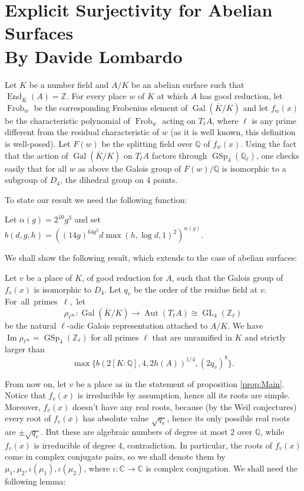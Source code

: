\section{Explicit Surjectivity for Abelian Surfaces \\ By Davide Lombardo} \label{lombardstreet}

Let $K$ be a number field and $A/K$ be an abelian surface such that $\operatorname{End}_{\overline{K}}(A)=\mathbb{Z}$. For every place $w$ of $K$ at which $A$ has good reduction, let $\operatorname{Frob}_w$ be the corresponding Frobenius element of $\operatorname{Gal}\left( \overline{K}/K\right)$ and let $f_w(x)$ be the characteristic polynomial of $\operatorname{Frob}_w$ acting on $T_\ell A$, where $\ell$ is any prime different from the residual characteristic of $w$ (as it is well known, this definition is well-posed). Let $F(w)$ be the splitting field over $\mathbb{Q}$ of $f_w(x)$. Using the fact that the action of $\operatorname{Gal}\left( \overline{K}/K \right)$ on $T_\ell A$ factors through $\operatorname{GSp}_4(\mathbb{Q}_\ell)$, one checks easily that for all $w$ as above the Galois group of $F(w)/\mathbb{Q}$ is isomorphic to a subgroup of $D_4$, the dihedral group on 4 points.

To state our result we need the following function:
\begin{definition}\label{def:bFunction}
Let $\alpha(g)=2^{10}g^3$ and set
$
b(d,g,h)=\left( (14g)^{64g^2} d \max\left(h, \log d,1 \right)^2 \right)^{\alpha(g)}.
$
\end{definition}

We shall show the following result, which extends \cite[Theorem 1.2]{lombardo2015explicit} to the case of abelian surfaces:
\begin{proposition}\label{prop:Main}
Let $v$ be a place of $K$, of good reduction for $A$, such that the Galois group of $f_v(x)$ is isomorphic to $D_4$. Let $q_v$ be the order of the residue field at $v$. \mbox{For all primes $\ell$, let}
\[
\rho_{\ell^\infty} : \operatorname{Gal}\left( \overline{K}/K \right) \to \operatorname{Aut}(T_\ell A) \cong \operatorname{GL}_4(\mathbb{Z}_\ell)
\]
be the natural $\ell$-adic Galois representation attached to $A/K$. We have $\operatorname{Im} \rho_{\ell^\infty}=\operatorname{GSp}_4(\mathbb{Z}_\ell)$ for all primes $\ell$ that are unramified in $K$ and strictly larger than
\[
\max\{b(2[K:\mathbb{Q}],4,2h(A))^{1/4}, (2q_v)^8 \}.
\]
\end{proposition}


From now on, let $v$ be a place as in the statement of proposition \ref{prop:Main}. 
Notice that $f_v(x)$ is irreducible by assumption, hence all its roots are simple. Moreover, $f_v(x)$ doesn't have any real roots, because (by the Weil conjectures) every root of $f_v(x)$ has absolute value $\sqrt{q_v}$, hence its only possible real roots are $\pm \sqrt{q_v}$. But these are algebraic numbers of degree at most 2 over $\mathbb{Q}$, while $f_v(x)$ is irreducible of degree 4, contradiction.
In particular, the roots of $f_v(x)$ come in complex conjugate pairs, so we shall denote them by $\mu_1, \mu_2, \iota(\mu_1), \iota(\mu_2)$, where $\iota : \mathbb{C} \to \mathbb{C}$ is complex conjugation.  We shall need the following lemma:

